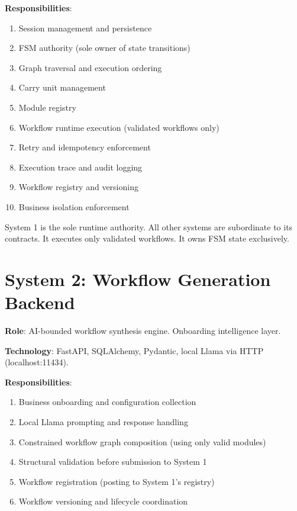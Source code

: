 \documentclass[12pt, a4paper]{report}
\newenvironment{invariantbox}[1]{%
  \begin{tcolorbox}[
    colback=red!4!white,
    colframe=warningred,
    title={\textbf{INVARIANT: #1}},
    fonttitle=\small\bfseries
  ]
}{%
  \end{tcolorbox}
}
\begin{document}
\textbf{Responsibilities}:
\begin{enumerate}
  \item Session management and persistence
  \item FSM authority (sole owner of state transitions)
  \item Graph traversal and execution ordering
  \item Carry unit management
  \item Module registry
  \item Workflow runtime execution (validated workflows only)
  \item Retry and idempotency enforcement
  \item Execution trace and audit logging
  \item Workflow registry and versioning
  \item Business isolation enforcement
\end{enumerate}

\begin{invariantbox}{System 1 Authority}
System 1 is the sole runtime authority. All other systems are subordinate to its contracts. It executes only validated workflows. It owns FSM state exclusively.
\end{invariantbox}

\section{System 2: Workflow Generation Backend}

\textbf{Role}: AI-bounded workflow synthesis engine. Onboarding intelligence layer.

\textbf{Technology}: FastAPI, SQLAlchemy, Pydantic, local Llama via HTTP (localhost:11434).

\textbf{Responsibilities}:
\begin{enumerate}
  \item Business onboarding and configuration collection
  \item Local Llama prompting and response handling
  \item Constrained workflow graph composition (using only valid modules)
  \item Structural validation before submission to System 1
  \item Workflow registration (posting to System 1's registry)
  \item Workflow versioning and lifecycle coordination
\end{enumerate}
\end{document}
